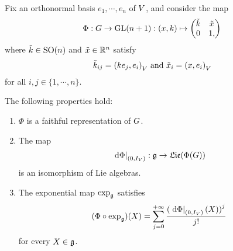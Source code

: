 \begin{proposition}
    Fix an orthonormal basis $e_1, \cdots, e_n$ of $V$,
    and consider the map
    \begin{align*}
        \Phi : G \to \mathrm{GL}(n + 1) : (x, k) \mapsto
        \begin{pmatrix}
            \tilde k & \tilde x\\
            0 & 1,
        \end{pmatrix}
    \end{align*}
    where $\tilde k \in {\mathrm{SO} (n)}$ and $\tilde x \in \mathbb{R}^n$ satisfy
    \begin{align*}
        {\tilde k}_{ij} = {\left(k e_j, e_i\right)_{V}} \text{ and } {\tilde x}_i = {\left(x, e_i\right)_{V}}
    \end{align*}
    for all $i, j \in \{1, \cdots, n\}$.

    The following properties hold:
    \begin{enumerate}
        \item $\Phi$ is a faithful representation of $G$.
        \item The map
            \begin{align*}
                \left. \,\mathrm{d} \Phi \right|_{(0, {I_{V}})} : \mathfrak{g} \to \mathfrak{Lie}(\Phi(G))
            \end{align*}
            is an isomorphism of Lie algebras.
        \item The exponential map $\exp_{\mathfrak{g}}$ satisfies
            \begin{align*}
                (\Phi \circ \exp_{\mathfrak{g}}) (X) = \sum_{j = 0}^{+\infty} \frac {{(\left. \,\mathrm{d} \Phi \right|_{(0, {I_{V}})}(X))}^j} {j!}
            \end{align*}
            for every $X \in \mathfrak{g}$.
    \end{enumerate}
\end{proposition}
